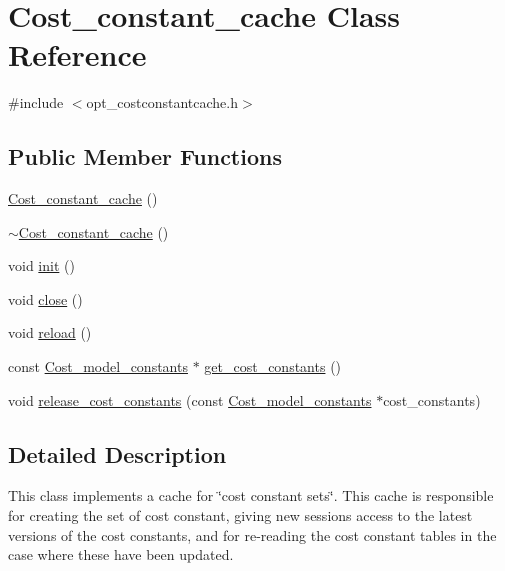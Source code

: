 \hypertarget{classCost__constant__cache}{}\section{Cost\+\_\+constant\+\_\+cache Class Reference}
\label{classCost__constant__cache}


{\ttfamily \#include $<$opt\+\_\+costconstantcache.\+h$>$}

\subsection*{Public Member Functions}
\begin{DoxyCompactItemize}
\item 
\mbox{\hyperlink{classCost__constant__cache_aa428329188f6a76a121615419d4ef73f}{Cost\+\_\+constant\+\_\+cache}} ()
\item 
\mbox{\hyperlink{classCost__constant__cache_a31b347d1012ee2fa400fecd7a2819b2b}{$\sim$\+Cost\+\_\+constant\+\_\+cache}} ()
\item 
void \mbox{\hyperlink{classCost__constant__cache_a27341cb9a16b958f01fc394f3c1c8118}{init}} ()
\item 
void \mbox{\hyperlink{classCost__constant__cache_a9606f8ca892056e98dd852f24994ee70}{close}} ()
\item 
void \mbox{\hyperlink{classCost__constant__cache_a44df0f5b25e6e62b9df8d15451616921}{reload}} ()
\item 
const \mbox{\hyperlink{classCost__model__constants}{Cost\+\_\+model\+\_\+constants}} $\ast$ \mbox{\hyperlink{classCost__constant__cache_ade6946bec347063cbf5ad09cafbb97a0}{get\+\_\+cost\+\_\+constants}} ()
\item 
void \mbox{\hyperlink{classCost__constant__cache_a9f8a07c3d8481469e7aebadd3b11298f}{release\+\_\+cost\+\_\+constants}} (const \mbox{\hyperlink{classCost__model__constants}{Cost\+\_\+model\+\_\+constants}} $\ast$cost\+\_\+constants)
\end{DoxyCompactItemize}


\subsection{Detailed Description}
This class implements a cache for \char`\"{}cost constant sets\char`\"{}. This cache is responsible for creating the set of cost constant, giving new sessions access to the latest versions of the cost constants, and for re-\/reading the cost constant tables in the case where these have been updated.

